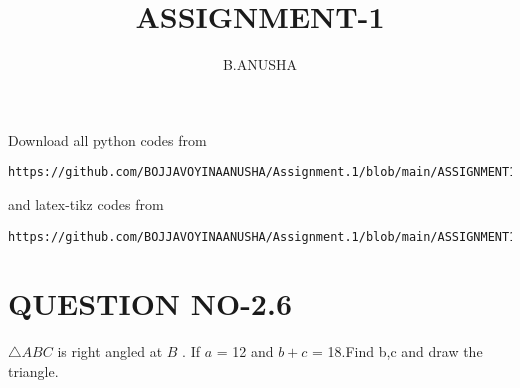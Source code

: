 \documentclass[journal,12pt,twocolumn]{IEEEtran}
\begin{document}
     \def\rightbox#1{\makebox[0in][r]{#1}}
     \def\centbox#1{\makebox[0in]{#1}}
     \def\topbox#1{\raisebox{-\baselineskip}[0in][0in]{#1}}
     \def\midbox#1{\raisebox{-0.5\baselineskip}[0in][0in]{#1}}
\vspace{3cm}
\title{ASSIGNMENT-1}
\author{B.ANUSHA}
\maketitle
\newpage
\bigskip
\renewcommand{\thefigure}{\theenumi}
\renewcommand{\thetable}{\theenumi}
Download all python codes from 
\begin{lstlisting}
https://github.com/BOJJAVOYINAANUSHA/Assignment.1/blob/main/ASSIGNMENT1/assignment1.py
\end{lstlisting}
%
and latex-tikz codes from 
\begin{lstlisting}
https://github.com/BOJJAVOYINAANUSHA/Assignment.1/blob/main/ASSIGNMENT1/main.tex
\end{lstlisting}
%
\section{QUESTION NO-2.6}
$\triangle ABC$ is right angled at $B$ . If $a$ = 12 and $b+c$ = 18.Find b,c and draw the triangle.
%
\end{document}
